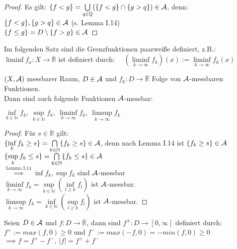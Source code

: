\documentclass[11pt,a4paper,fleqn,openany]{report}
\begin{document}
    \begin{proof}
      Es gilt: $\{f < g\} = \bigcup\limits_{q \in \mathbb{Q}} (\{f < g\} \cap \{g > q\}) \in \mathcal{A}$, denn:\\
      $\{f < g\}, \{g > q\} \in \mathcal{A}$ (s. Lemma I.14)\\
      $\{f \leq g\} = D \setminus \{f > g\} \in \mathcal{A}$
    \end{proof}

    \begin{remark}
      Im folgenden Satz sind die Grenzfunktionen paarweiße definiert, z.B.:\\
      $\liminf f_x : X \to \bar{\mathbb{R}}$ ist definiert durch: \ \ $(\liminf\limits_{k \to \infty} f_k)(x) := \liminf\limits_{k \to \infty} f_k (x)$
    \end{remark}

    \begin{theorem}
      $(X, \mathcal{A})$ messbarer Raum, $D \in \mathcal{A}$ und $f_k:D \to \bar{\mathbb{R}}$ Folge von $\mathcal{A}$-messbaren Funktionen.\\
      Dann sind auch folgende Funktionen $\mathcal{A}$-messbar:
      \begin{center}
        $\inf\limits_{k \in \mathbb{N}} f_k, \ \sup\limits_{k \in \mathbb{N}} f_k, \ \liminf\limits_{k \to \infty} f_k, \ \limsup\limits_{k \to \infty} f_k$
      \end{center}
    \end{theorem}

    \begin{proof}
      Für $s \in \mathbb{R}$ gilt:\\
      $\{\inf\limits_k f_k \geq s\} = \bigcap\limits_{k \in \mathbb{N}} \{f_k \geq s\} \in \mathcal{A}$, denn nach Lemma I.14 ist $\{f_k \geq s\} \in \mathcal{A}$\\
      $\{\sup\limits_k f_k \leq s\} = \bigcap\limits_{k \in \mathbb{N}} \{f_k \leq s\} \in \mathcal{A}$\\
      $\stackrel{\text{Lemma I.14}}{\implies} \inf f_k, \sup f_k$ sind $\mathcal{A}$-messbar\\
      $\liminf\limits_{k \to \infty} f_k = \sup\limits_{k \in \mathbb{N}} (\inf\limits_{l \geq k} f_l)$ ist $\mathcal{A}$-messbar.\\
      $\limsup\limits_{k \to \infty} f_k = \inf\limits_{k \in \mathbb{N}} (\sup\limits_{l \geq k} f_l)$ ist $\mathcal{A}$-messbar.
    \end{proof}

    \begin{notation}
      Seien $D \in \mathcal{A}$ und $f: D \to \bar{\mathbb{R}}$, dann sind $f^{\pm}:D \to [0, \infty]$ definiert durch:\\
      $f^+ := max(f, 0) \geq 0$ und $f^- := max(-f, 0) = -min(f, 0) \geq 0$\\
      $\implies f = f^+ - f^-, \ |f| = f^+ + f^-$
    \end{notation}
\end{document}
